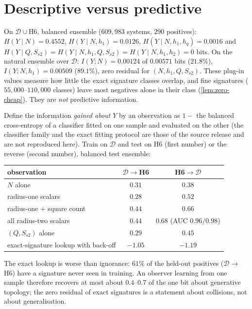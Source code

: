 \section{Descriptive versus predictive}\label{sec:oos}
\begin{observation}\label{obs:plugin}
On $\mathcal D\cup$H6, balanced ensemble ($609{,}983$ systems, $290$ positives): $H(Y\mid N)=0.4552$, $H(Y\mid N,h_1)=0.0126$, $H(Y\mid N,h_1,h_q)=0.0016$ and $H(Y\mid Q,S_{s2})=H(Y\mid N,h_1,Q,S_{s2})=H(Y\mid N,h_1,h_2)=0$ bits. On the natural ensemble over $\mathcal D$: $I(Y;N)=0.00124$ of $0.00571$ bits ($21.8\%$), $I(Y;N,h_1)=0.00509$ ($89.1\%$), zero residual for $(N,h_1,Q,S_{s2})$. These plug-in values measure how little the exact signature classes overlap, and fine signatures ($55{,}000$--$110{,}000$ classes) leave most negatives alone in their class (\cref{lem:zero-cheap}). They are \emph{not} predictive information.
\end{observation}
\begin{observation}\label{obs:oos}
Define the information \emph{gained about $Y$} by an observation as $1-$ the balanced cross-entropy of a classifier fitted on one sample and evaluated on the other (the classifier family and the exact fitting protocol are those of the source release and are not reproduced here). Train on $\mathcal D$ and test on H6 (first number) or the reverse (second number), balanced test ensemble:
\begin{center}\small
\begin{tabular}{@{}lcc@{}}\toprule
observation & $\mathcal D\to$H6 & H6$\to\mathcal D$\\ \midrule
$N$ alone & $0.31$ & $0.38$\\
radius-one scalars & $0.28$ & $0.52$\\
radius-one $+$ square count & $0.44$ & $0.66$\\
all radius-two scalars & $0.44$ & $0.68$ (AUC $0.96$/$0.98$)\\
$(Q,S_{s2})$ alone & $0.29$ & $0.45$\\
exact-signature lookup with back-off & $-1.05$ & $-1.19$\\ \bottomrule
\end{tabular}
\end{center}
The exact lookup is worse than ignorance: $61\%$ of the held-out positives ($\mathcal D\to$H6) have a signature never seen in training. An observer learning from one sample therefore recovers at most about $0.4$--$0.7$ of the one bit about generative topology; the zero residual of exact signatures is a statement about collisions, not about generalisation.
\end{observation}
